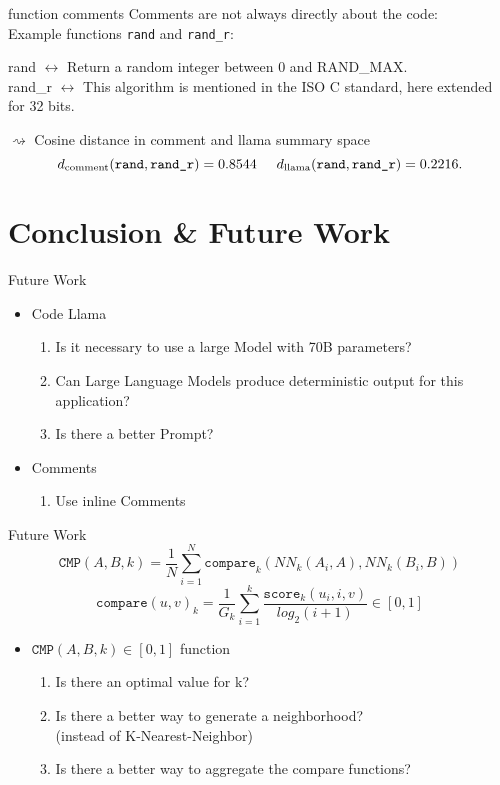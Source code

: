 \documentclass[aspectratio=1610,12pt]{beamer}
\begin{document}
\begin{frame}{function comments}
  Comments are not always directly about the code:\\
  Example functions \texttt{rand} and \texttt{rand\_r}:
  \begin{center}
    rand $\leftrightarrow$ Return a random integer between 0
      and RAND\_MAX.\\
    rand\_r  $\leftrightarrow$ This algorithm is mentioned in 
    the ISO C standard, here extended for 32 bits.
  \end{center}
  $\rightsquigarrow$ Cosine distance in comment and 
  llama summary space
    \[
      d_\text{comment}(\texttt{rand}, \texttt{rand\_r}) = 0.8544
      \hspace{0.5cm}
      d_\text{llama}(\texttt{rand}, \texttt{rand\_r}) = 0.2216.
    \]
\end{frame}


\section{Conclusion \& Future Work}
\begin{frame}{Future Work}
  \begin{itemize}
    \item Code Llama
      \begin{enumerate}
        \item Is it necessary to use a 
          large Model with 70B parameters?
        \item Can Large Language Models 
        produce deterministic output for this application?
        \item Is there a better Prompt?
      \end{enumerate}
    \item Comments
      \begin{enumerate}
        \item Use inline Comments
      \end{enumerate}
  \end{itemize}
\end{frame}

\begin{frame}{Future Work}
    \[
    \texttt{CMP}(A,B,k) = \frac{1}{N}\sum_{i = 1}^{N}
      \texttt{compare}_k(NN_k(A_i,A),NN_k(B_i, B))
    \]
    \[
    \texttt{compare}(u,v)_k = 
      \frac{1}{G_k} \sum^{k}_{i=1} 
      \frac{ \texttt{score}_{k}(u_i,i,v)}{log_2(i+1)} 
      \in [0,1]
    \]
  \begin{itemize}
  \item $\texttt{CMP}(A,B,k) \in [0,1] $ function
    \begin{enumerate}
      \item Is there an optimal value for k?
      \item Is there a better way to generate a neighborhood?\\
        (instead of K-Nearest-Neighbor)
      \item Is there a better way to aggregate the compare functions?
    \end{enumerate}
  \end{itemize}
\end{frame}
\end{document}
